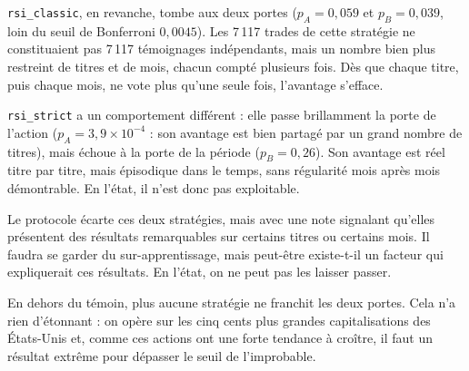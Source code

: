 \texttt{rsi\_classic}, en revanche, tombe aux deux portes
($p_A = 0{,}059$ et $p_B = 0{,}039$, loin du seuil de Bonferroni
$0{,}0045$). Les 7\,117 trades de cette stratégie ne
constituaient pas 7\,117 témoignages indépendants, mais un nombre bien plus
restreint de titres et de mois, chacun compté plusieurs fois. Dès que
chaque titre, puis chaque mois, ne vote plus qu'une seule fois, l'avantage
s'efface.

\texttt{rsi\_strict} a un comportement différent : elle passe brillamment la
porte de l'action ($p_A = 3{,}9\times10^{-4}$ : son avantage est bien partagé
par un grand nombre de titres), mais échoue à la porte de la période
($p_B = 0{,}26$). Son avantage est réel titre par titre, mais
épisodique dans le temps, sans régularité mois après mois
démontrable. En l'état, il n'est donc pas exploitable.

Le protocole écarte ces deux stratégies, mais avec une note signalant qu'elles
présentent des résultats remarquables sur certains titres ou certains mois.
Il faudra se garder du sur-apprentissage, mais peut-être existe-t-il un
facteur qui expliquerait ces résultats. En l'état, on ne peut pas les laisser
passer.

En dehors du témoin, plus aucune stratégie ne franchit les deux portes. Cela
n'a rien d'étonnant : on opère sur les cinq cents plus grandes capitalisations
des États-Unis et, comme ces actions ont une forte tendance à croître, il faut
un résultat extrême pour dépasser le seuil de l'improbable.



